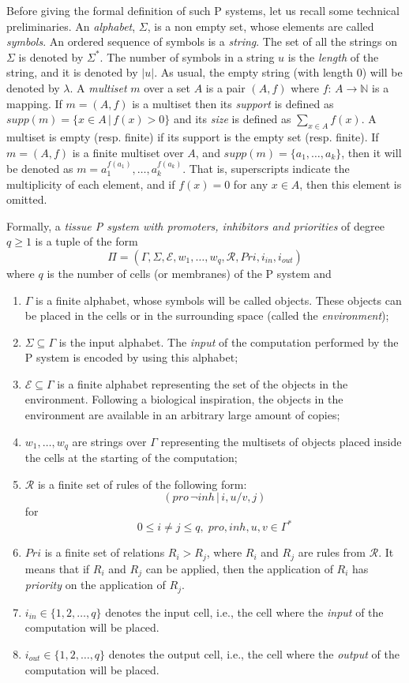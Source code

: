 \documentclass[journal]{IEEEtran}
\begin{document}
Before giving the formal definition of such P systems, let us recall
some technical preliminaries. An \emph{alphabet}, $\Sigma$, is a non
empty set, whose elements are called \emph{symbols}. An ordered
sequence of symbols is a \emph{string}. The set of all the strings
on $\Sigma$ is denoted by $\Sigma^*$. The number of symbols in a
string $u$ is the \emph{length} of the string, and it is denoted by
$|u|$. As usual, the empty string (with length 0) will be denoted by
$\lambda$. A {\em multiset} $m$ over a set $A$ is a pair $(A,f)$
where $f:\,A\to {\mathbb N}$ is a mapping. If $m=(A,f)$ is a
multiset then its {\em support} is defined as $supp(m)=\{x\in A
\,|\,f(x)> 0\}$ and its \emph{size} is defined as $\sum_{x\in
A}f(x)$. A multiset is empty (resp. finite) if its support is the
empty set (resp. finite). If $m=(A,f)$ is a finite multiset over
$A$, and $supp(m)=\{ a_1,\ldots,a_k\}$, then it will be denoted as
$m=a_1^{f(a_1)},\dots,a_k^{f(a_k)}$. That is, superscripts indicate
the multiplicity of each element, and if $f(x)=0$ for any $x\in A$,
then this element is omitted.

Formally, a \emph{tissue P system with promoters, inhibitors and
priorities} of degree $q\geq 1$ is a tuple of the form
$$
    \Pi=(\Gamma,\Sigma,\mathcal{E},w_1,\dots,w_q,\mathcal{R},Pri,i_{in},i_{out})
$$
where $q$ is the number of cells (or membranes) of the P system and
\begin{enumerate}
    \item $\Gamma$ is a finite alphabet, whose symbols will be called objects.
    These objects can be placed in the cells or in the surrounding space (called
    the {\it environment});
    \item $\Sigma\subseteq\Gamma$ is the input alphabet. The {\it input} of the
    computation performed by the P system is encoded by using this alphabet;
    \item $\mathcal{E}\subseteq \Gamma$ is a finite alphabet representing the set
    of the objects in the environment. Following a biological inspiration, the
    objects in the environment are available in an arbitrary large amount of
    copies;
    \item $w_1,\dots,w_q$ are strings over $\Gamma$ representing the multisets of
    objects placed inside the cells at the starting of the computation;
    \item $\mathcal{R}$ is a finite set of rules of the following form:
    $$
    (pro\,\neg inh\,|\,i,u/v,j)
    $$
    for 
    $$
    0\leq i\neq j\leq q,\;pro,inh,u,v\in
    \Gamma^*
    $$
    \item $Pri$ is a finite set of relations $R_i > R_j$, where $R_i$ and $R_j$
    are rules from $\mathcal{R}$. It means that if $R_i$ and $R_j$ can be applied,
    then the application of $R_i$ has {\it priority} on the application of $R_j$.
    \item $i_{in}\in \{1,2,\dots,q\}$ denotes the input cell, i.e., the cell where
    the {\it input} of the computation will be placed.
    \item $i_{out}\in \{1,2,\dots,q\}$ denotes the output cell, i.e., the cell
    where the {\it output} of the computation will be placed.
\end{enumerate}
\end{document}
